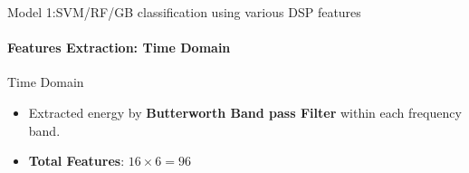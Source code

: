 \documentclass{beamer}
\begin{document}
\begin{frame}{Model 1:SVM/RF/GB classification using various DSP features}
  \framesubtitle{Features Extraction: Time Domain}

  \begin{block}{Time Domain}
    \begin{itemize}
    \item Extracted energy by \textbf{Butterworth Band pass Filter} within each
      frequency band.
    \item \textbf{Total Features}: $16 \times 6 = 96$
    \end{itemize}
    
  \end{block}
  
\end{frame}

 
\end{document}
